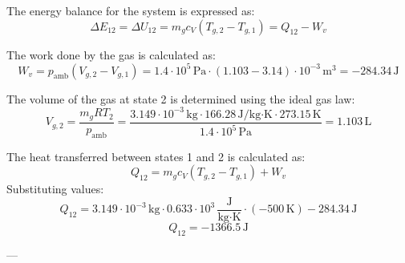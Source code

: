 The energy balance for the system is expressed as:  
\[
\Delta E_{12} = \Delta U_{12} = m_g c_V (T_{g,2} - T_{g,1}) = Q_{12} - W_v
\]  

The work done by the gas is calculated as:  
\[
W_v = p_{\text{amb}}(V_{g,2} - V_{g,1}) = 1.4 \cdot 10^5 \, \text{Pa} \cdot (1.103 - 3.14) \cdot 10^{-3} \, \text{m}^3 = -284.34 \, \text{J}
\]  

The volume of the gas at state 2 is determined using the ideal gas law:  
\[
V_{g,2} = \frac{m_g R T_2}{p_{\text{amb}}} = \frac{3.149 \cdot 10^{-3} \, \text{kg} \cdot 166.28 \, \text{J/kg·K} \cdot 273.15 \, \text{K}}{1.4 \cdot 10^5 \, \text{Pa}} = 1.103 \, \text{L}
\]  

The heat transferred between states 1 and 2 is calculated as:  
\[
Q_{12} = m_g c_V (T_{g,2} - T_{g,1}) + W_v
\]  
Substituting values:  
\[
Q_{12} = 3.149 \cdot 10^{-3} \, \text{kg} \cdot 0.633 \cdot 10^3 \, \frac{\text{J}}{\text{kg·K}} \cdot (-500 \, \text{K}) - 284.34 \, \text{J}
\]  
\[
Q_{12} = -1366.5 \, \text{J}
\]  

---